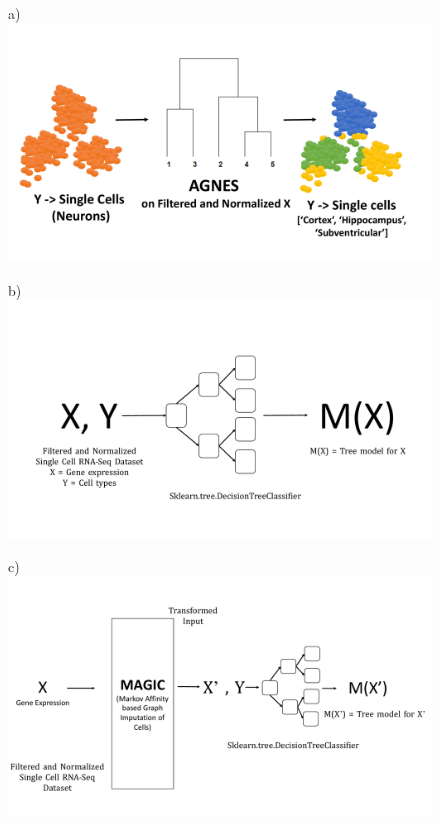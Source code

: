 \begin{figure}
\begin{framed}
\begin{minipage}{\linewidth}
\begin{minipage}[t]{0.48\linewidth}
\vspace{0pt}
\textsf{a)}\\
\includegraphics[width=\linewidth]{agnes.pdf}
\end{minipage}
\begin{minipage}[t]{0.48\linewidth}
\vspace{0pt}
\textsf{b)}\\
\includegraphics[width=\linewidth]{without_autoencoding.pdf}
\end{minipage}
\end{minipage}
\begin{minipage}{\linewidth}
\begin{minipage}[t]{0.48\linewidth}
\vspace{0pt}
\textsf{c)}\\
\includegraphics[width=\linewidth]{with_magic.pdf}

\end{minipage}
\end{minipage}
\end{framed}
\end{figure}
